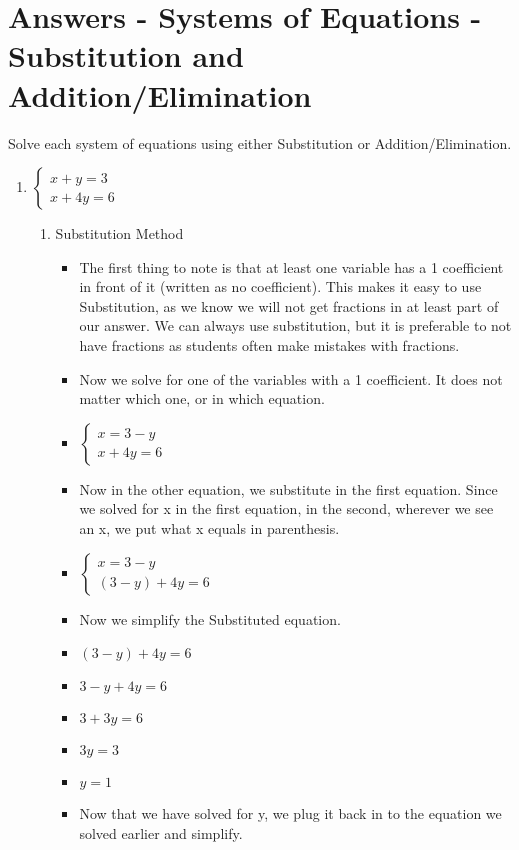 \documentclass{article}
\begin{document}
\section{Answers - Systems of Equations - Substitution and Addition/Elimination}
Solve each system of equations using either Substitution or Addition/Elimination.
\begin{enumerate}
\item $\left\{ \begin{array}{l}
      x+y =3 \\
      x+4y=6 \end{array} \right.$
  \begin{enumerate}
  \item Substitution Method
    \begin{itemize}
    \item The first thing to note is that at least one variable has a 1 coefficient in front of it (written as no coefficient). This makes it easy to use Substitution, as we know we will not get fractions in at least part of our answer. We can always use substitution, but it is preferable to not have fractions as students often make mistakes with fractions.
    \item Now we solve for one of the variables with a 1 coefficient. It does not matter which one, or in which equation.
    \item [] $\left\{ \begin{array}{l}
             x=3-y \\
             x+4y=6 \end{array} \right.$
    \item Now in the other equation, we substitute in the first equation. Since we solved for x in the first equation, in the second, wherever we see an x, we put what x equals in parenthesis.
    \item [] $\left\{ \begin{array}{l}
             x=3-y \\
             (3-y)+4y=6 \end{array} \right.$
    \item Now we simplify the Substituted equation.
    \item [] $(3-y)+4y=6$
    \item [] $3-y+4y=6$
    \item [] $3+3y=6$
    \item [] $3y=3$
    \item [] $y=1$
    \item Now that we have solved for y, we plug it back in to the equation we solved earlier and simplify.

\end{itemize}
\end{enumerate}
\end{enumerate}
\end{document}
